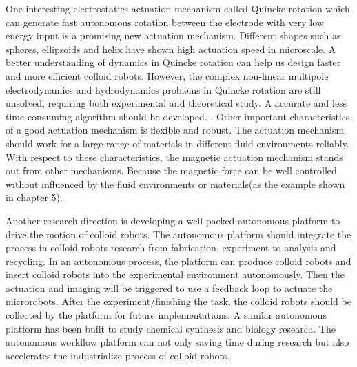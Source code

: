 One interesting electrostatics actuation mechanism called Quincke rotation which can generate fast autonomous rotation between the electrode with very low energy input is a promising new actuation mechanism. \cite{das2013electrohydrodynamic} Different shapes such as spheres, ellipsoids and helix have shown high actuation speed in microscale.\cite{brosseau2019relating,das2019active} A better understanding of dynamics in Quincke rotation can help us design faster and more efficient colloid robots. However, the complex non-linear multipole electrodynamics and hydrodynamics problems in Quincke rotation are still unsolved, requiring  both experimental and theoretical study. A accurate  and  less time-consuming algorithm should be developed. \cite{fiore2019fast}. Other important characteristics of a good actuation mechanism  is flexible and robust. The actuation mechanism should work for a large range of materials in different fluid environments reliably. With respect to these characteristics,  the magnetic actuation mechanism stands out from other mechanisms. Because the magnetic force can be well controlled without influenced by the fluid environments or materials(as the example shown in chapter 5).

Another research direction is developing a well packed autonomous platform to drive the motion of colloid  robots.  The autonomous platform should integrate the process in colloid robots research from fabrication, experiment to analysis and recycling. In an autonomous process, the platform can produce colloid robots and insert colloid robots into the experimental environment autonomously. Then the actuation and imaging will be triggered to  use a feedback loop to actuate the microrobots. After the experiment/finishing the task, the colloid robots should be collected by the platform for future implementations. A similar autonomous platform has been built to study chemical synthesis and biology research. \cite{grizou2020curious,chao2019systems} The autonomous workflow platform can not only saving time during research but also accelerates the industrialize process of colloid robots.   


